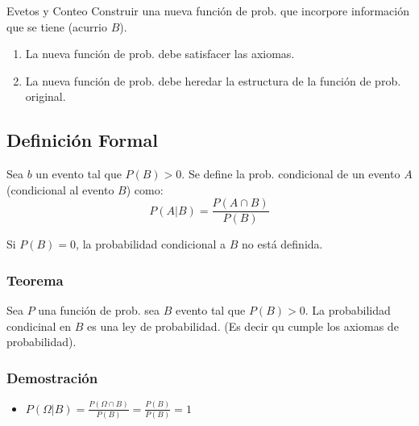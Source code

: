 \documentclass[a4paper]{book}
\begin{document}
\begin{chapter}{Evetos y Conteo}
    Construir una nueva función de prob. que incorpore información que se tiene (acurrio $B$).

    \begin{obs}
        \begin{enumerate}[{1. }]

            \item La nueva función de prob. debe satisfacer las axiomas.

            \item La nueva función de prob. debe heredar la estructura de la
                función de prob. original.

        \end{enumerate}
    \end{obs}

    \subsection{Definición Formal}
    \label{ssec:definicion_formal}

    Sea $b$ un evento tal que $P\left(B\right)>0$. Se define la prob. condicional de un evento $A$ (condicional al evento $B$) como:
    \begin{equation*}
        P\left(A|B\right)=\frac{P\left(A\cap B\right)}{P\left(B\right)}
    \end{equation*}

    \begin{obs}
        Si $P\left(B\right)=0$, la probabilidad condicional a $B$ no está definida.
    \end{obs}

    \subsubsection{Teorema}
    \label{ssec:teorema}

    Sea $P$ una función de prob. sea $B$ evento tal que $P\left(B\right)>0$. La
    probabilidad condicinal en $B$ es una ley de probabilidad. (Es decir qu
    cumple los axiomas de probabilidad).

    \subsubsection{Demostración}

    \begin{itemize}
        \item $P\left(\Omega|B\right) =\frac{P\left(\Omega\cap
            B\right)}{P\left(B\right)} =\frac{P\left(B\right)}{P\left(B\right)}
            = 1$


\end{itemize}
\end{chapter}
\end{document}
